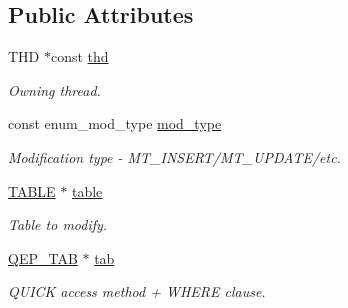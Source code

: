 \subsection*{Public Attributes}
\begin{DoxyCompactItemize}
\item 
\mbox{\label{classModification__plan_a2667085b2d418c26636cb88a940172cb}} 
T\+HD $\ast$const \mbox{\hyperlink{classModification__plan_a2667085b2d418c26636cb88a940172cb}{thd}}
\begin{DoxyCompactList}\small\item\em Owning thread. \end{DoxyCompactList}\item 
\mbox{\label{classModification__plan_a2c9bbe05367c8efe91bb8a0ffa246696}} 
const enum\+\_\+mod\+\_\+type \mbox{\hyperlink{classModification__plan_a2c9bbe05367c8efe91bb8a0ffa246696}{mod\+\_\+type}}
\begin{DoxyCompactList}\small\item\em Modification type -\/ M\+T\+\_\+\+I\+N\+S\+E\+R\+T/\+M\+T\+\_\+\+U\+P\+D\+A\+T\+E/etc. \end{DoxyCompactList}\item 
\mbox{\label{classModification__plan_a0e0e25a14f263652c032a4f51d17a9aa}} 
\mbox{\hyperlink{structTABLE}{T\+A\+B\+LE}} $\ast$ \mbox{\hyperlink{classModification__plan_a0e0e25a14f263652c032a4f51d17a9aa}{table}}
\begin{DoxyCompactList}\small\item\em Table to modify. \end{DoxyCompactList}\item 
\mbox{\label{classModification__plan_a569172a72a91910aa46da363d9ce69bd}} 
\mbox{\hyperlink{classQEP__TAB}{Q\+E\+P\+\_\+\+T\+AB}} $\ast$ \mbox{\hyperlink{classModification__plan_a569172a72a91910aa46da363d9ce69bd}{tab}}
\begin{DoxyCompactList}\small\item\em Q\+U\+I\+CK access method + W\+H\+E\+RE clause. \end{DoxyCompactList}\item 
\mbox{\label{classModification__plan_a3a7a0ffc69f523bd67f2157f27431764}} 

\end{DoxyCompactItemize}
